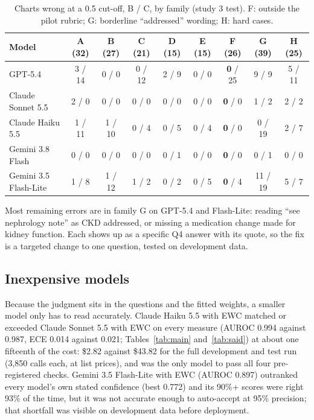 \documentclass[10pt,letterpaper]{article}
\begin{document}
\begin{table}[!htbp]
\centering\small
\caption{Charts wrong at a 0.5 cut-off, B / C, by family (study 3 test). F: outside the pilot rubric; G: borderline ``addressed'' wording; H: hard cases.}\label{tab:families}
\begin{tabular}{@{}lcccccccc@{}}
\toprule
Model & A (32) & B (27) & C (21) & D (15) & E (15) & F (26) & G (39) & H (25) \\
\midrule
GPT-5.4 & 3 / 14 & 0 / 0 & 0 / 12 & 2 / 9 & 0 / 0 & \textbf{0} / 25 & 9 / 9 & 5 / 11 \\
Claude Sonnet 5.5 & 2 / 0 & 0 / 0 & 0 / 0 & 0 / 0 & 0 / 0 & \textbf{0} / 0 & 1 / 2 & 2 / 2 \\
Claude Haiku 5.5 & 1 / 11 & 1 / 10 & 0 / 4 & 0 / 5 & 0 / 4 & \textbf{0} / 0 & 0 / 19 & 2 / 7 \\
Gemini 3.8 Flash & 0 / 0 & 0 / 0 & 0 / 0 & 0 / 1 & 0 / 0 & \textbf{0} / 0 & 0 / 1 & 0 / 0 \\
Gemini 3.5 Flash-Lite & 1 / 8 & 1 / 12 & 1 / 2 & 0 / 2 & 0 / 5 & \textbf{0} / 4 & 11 / 19 & 5 / 7 \\
\bottomrule
\end{tabular}
\end{table}

Most remaining errors are in family G on GPT-5.4 and Flash-Lite: reading ``see nephrology note'' as CKD addressed, or missing a medication change made for kidney function. Each shows up as a specific Q4 answer with its quote, so the fix is a targeted change to one question, tested on development data.

\subsection{Inexpensive models}\label{sec:cost}

Because the judgment sits in the questions and the fitted weights, a smaller model only has to read accurately. Claude Haiku 5.5 with EWC matched or exceeded Claude Sonnet 5.5 with EWC on every measure (AUROC 0.994 against 0.987, ECE 0.014 against 0.021; Tables~\ref{tab:main} and~\ref{tab:said}) at about one fifteenth of the cost: \$2.82 against \$43.82 for the full development and test run (3,850 calls each, at list prices), and was the only model to pass all four pre-registered checks. Gemini 3.5 Flash-Lite with EWC (AUROC 0.897) outranked every model's own stated confidence (best 0.772) and its 90\%+ scores were right 93\% of the time, but it was not accurate enough to auto-accept at 95\% precision; that shortfall was visible on development data before deployment.
\end{document}

